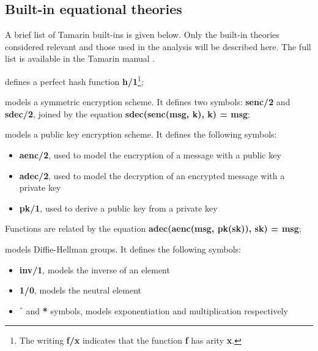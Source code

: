 \subsection{Built-in equational theories}
\label{sub:built-in-equational-theories}
A brief list of Tamarin built-ins is given below. Only the built-in theories considered relevant and those used in the analysis will be described here. The full list is available in the Tamarin manual \cite{TamarinProverManual}.

\begin{description}[style=nextline]
    \item[hashing] defines a perfect hash function \textbf{h/1}\footnote{The writing \textbf{f/x} indicates that the function \textbf{f} has arity \textbf{x}.};
    \item[symmetric-encryption] models a symmetric encryption scheme. It defines two symbols: \textbf{senc/2} and \textbf{sdec/2}, joined by the equation \textbf{sdec(senc(msg, k), k) = msg};
    \item[asymmetric-encryption] models a public key encryption scheme. It defines the following symbols:

        \begin{itemize}
            \item{\textbf{aenc/2}, used to model the encryption of a message with a public key}
            \item{\textbf{adec/2}, used to model the decryption of an encrypted message with a private key}
            \item{\textbf{pk/1}, used to derive a public key from a private key}
        \end{itemize}

        Functions are related by the equation \textbf{adec(aenc(msg, pk(sk)), sk) = msg};

    \item[diffie-hellman] models Diffie-Hellman groups. It defines the following symbols:

        \begin{itemize}
            \item{\textbf{inv/1}, models the inverse of an element}
            \item{\textbf{1/0}, models the neutral element}
            \item{\textbf{$\hat{\mkern6mu}$} and \textbf{*} symbols, models exponentiation and multiplication respectively}
        \end{itemize}


\end{description}
